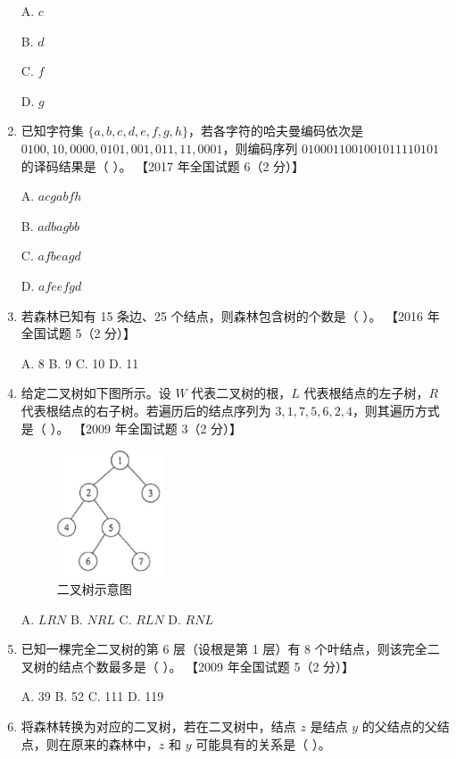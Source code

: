 \documentclass[lang=cn,newtx,10pt,scheme=chinese]{elegantbook}
\begin{document}
\begin{enumerate}
    A. $c$  

    B. $d$  

    C. $f$  

    D. $g$  

    \item 已知字符集 $\{a, b, c, d, e, f, g, h\}$，若各字符的哈夫曼编码依次是 $0100, 10, 0000, 0101, 001, 011, 11, 0001$，则编码序列 $0100011001001011110101$ 的译码结果是（ ）。  
    【2017 年全国试题 6（2 分）】  

    A. $acgabfh$  

    B. $adbagbb$  

    C. $afbeagd$  

    D. $afeefgd$  

    \item 若森林已知有 15 条边、25 个结点，则森林包含树的个数是（ ）。  
    【2016 年全国试题 5（2 分）】 

    A. 8 \quad B. 9 \quad C. 10 \quad D. 11  

    \item 给定二叉树如下图所示。设 $W$ 代表二叉树的根，$L$ 代表根结点的左子树，$R$ 代表根结点的右子树。若遍历后的结点序列为 $3, 1, 7, 5, 6, 2, 4$，则其遍历方式是（ ）。  
    【2009 年全国试题 3（2 分）】  

    \begin{figure}[h!]
            \centering
            \includegraphics[width=0.3\textwidth]{./figure/exercisePicPDF/chapter6/6-9.pdf}
            \caption{二叉树示意图}
    \end{figure}

    A. $LRN$ \quad B. $NRL$ \quad C. $RLN$ \quad D. $RNL$  

    \item 已知一棵完全二叉树的第 6 层（设根是第 1 层）有 8 个叶结点，则该完全二叉树的结点个数最多是（ ）。  
    【2009 年全国试题 5（2 分）】  

    A. 39 \quad B. 52 \quad C. 111 \quad D. 119  

    \item 将森林转换为对应的二叉树，若在二叉树中，结点 $z$ 是结点 $y$ 的父结点的父结点，则在原来的森林中，$z$ 和 $y$ 可能具有的关系是（ ）。  
    

\end{enumerate}
\end{document}
